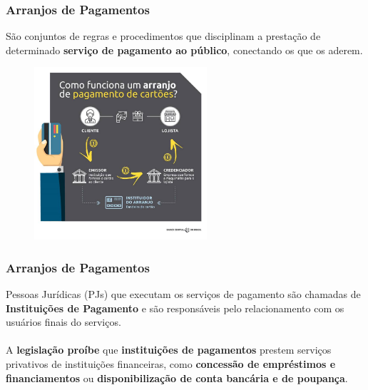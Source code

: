 \documentclass[10pt]{beamer}
\begin{document}
\begin{frame} 
\frametitle{Arranjos de Pagamentos}

São conjuntos de regras e procedimentos que disciplinam a prestação de determinado\textbf{ serviço de pagamento ao público}, conectando os que os aderem.

\begin{figure}[hbtp] %
	\centering
	\includegraphics[width=6.4cm]{exemplo_arranjo1.jpg}
\end{figure}

\end{frame}

\begin{frame} 
\frametitle{Arranjos de Pagamentos}

Pessoas Jurídicas (PJs) que executam os serviços de pagamento são chamadas de \textbf{Instituições de Pagamento} e são responsáveis pelo relacionamento com os usuários finais do serviços.
\\~\\

A \textbf{legislação proíbe} que \textbf{instituições de pagamentos} prestem serviços privativos de instituições financeiras, como \textbf{concessão de empréstimos e financiamentos} ou \textbf{disponibilização de conta bancária e de poupança}.

\end{frame}
\end{document}
